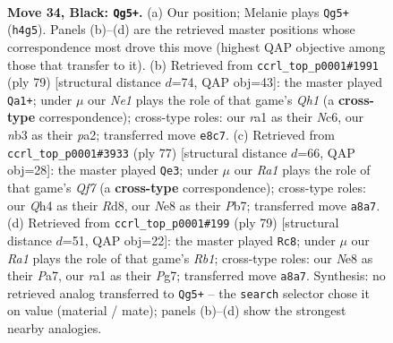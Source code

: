 \documentclass[11pt]{article}
\begin{document}
\clearpage

\begin{figure}[p]\centering
\begin{subfigure}{0.46\textwidth}\centering
\resizebox{\linewidth}{!}{%
\newchessgame
\chessboard[
  setfen={rn2nk2/1Q5p/7p/p1P2p1P/P6q/1N6/6K1/RN6 b - - 1 34},
  showmover=false,
  pgfstyle=straightmove, color=movearrow, markmove={h4-g5}
]}
\caption{}
\end{subfigure}\hfill
\begin{subfigure}{0.46\textwidth}\centering
\resizebox{\linewidth}{!}{%
\newchessgame
\chessboard[
  setfen={7q/1p1k1p2/p1n1p3/8/4PP1P/Q4N2/P4rR1/7K b - - 6 40},
  showmover=false,
  pgfstyle=straightmove, color=movearrow, markmove={h8-a1}
]}
\caption{}
\end{subfigure}
\\[4pt]
\begin{subfigure}{0.46\textwidth}\centering
\resizebox{\linewidth}{!}{%
\newchessgame
\chessboard[
  setfen={1k1r4/1p6/p3N1RP/5p2/4p3/P4N2/2P1nq2/K3Q3 b - - 1 39},
  showmover=false,
  pgfstyle=straightmove, color=movearrow, markmove={f2-e3}
]}
\caption{}
\end{subfigure}\hfill
\begin{subfigure}{0.46\textwidth}\centering
\resizebox{\linewidth}{!}{%
\newchessgame
\chessboard[
  setfen={1r3nk1/p5p1/3Qp2p/4P3/2P5/3N2P1/q6P/5RK1 b - - 1 40},
  showmover=false,
  pgfstyle=straightmove, color=movearrow, markmove={b8-c8}
]}
\caption{}
\end{subfigure}
\caption{\textbf{Move 34, Black: \texttt{Qg5+}.} (a) Our position; Melanie plays \texttt{Qg5+} (\texttt{h4g5}). Panels (b)--(d) are the retrieved master positions whose correspondence most drove this move (highest QAP objective among those that transfer to it). (b) Retrieved from \texttt{ccrl\_top\_p0001\#1991} (ply 79) [structural distance $d$=74, QAP obj=43]: the master played \texttt{Qa1+}; under $\mu$ our \emph{Ne1} plays the role of that game's \emph{Qh1} (a \textbf{cross-type} correspondence); cross-type roles: our \emph{r}a1 as their \emph{N}c6, our \emph{n}b3 as their \emph{p}a2; transferred move \texttt{e8c7}. (c) Retrieved from \texttt{ccrl\_top\_p0001\#3933} (ply 77) [structural distance $d$=66, QAP obj=28]: the master played \texttt{Qe3}; under $\mu$ our \emph{Ra1} plays the role of that game's \emph{Qf7} (a \textbf{cross-type} correspondence); cross-type roles: our \emph{Q}h4 as their \emph{R}d8, our \emph{N}e8 as their \emph{P}b7; transferred move \texttt{a8a7}. (d) Retrieved from \texttt{ccrl\_top\_p0001\#199} (ply 79) [structural distance $d$=51, QAP obj=22]: the master played \texttt{Rc8}; under $\mu$ our \emph{Ra1} plays the role of that game's \emph{Rb1}; cross-type roles: our \emph{N}e8 as their \emph{P}a7, our \emph{r}a1 as their \emph{P}g7; transferred move \texttt{a8a7}. Synthesis: no retrieved analog transferred to \texttt{Qg5+} -- the \texttt{search} selector chose it on value (material / mate); panels (b)--(d) show the strongest nearby analogies.}
\label{fig:thought-m67}
\end{figure}
\end{document}
